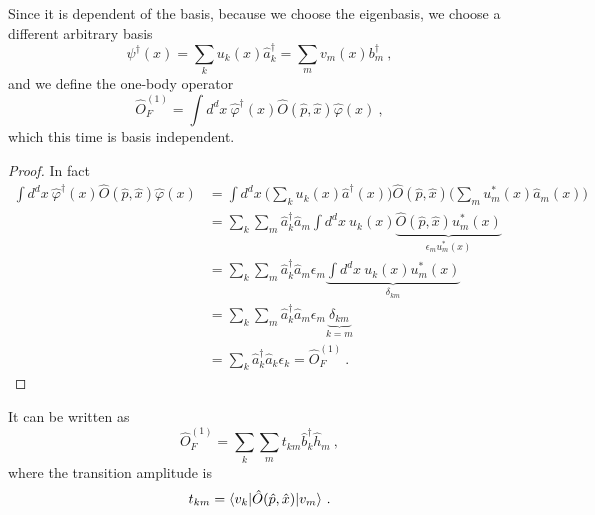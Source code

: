     Since it is dependent of the basis, because we choose the eigenbasis, we choose a different arbitrary basis 
    \begin{equation*}
        \psi^\dagger (x) = \sum_k u_k (x) \hat a^\dagger_k = \sum_m v_m (x) b^\dagger_m ~,
    \end{equation*}
    and we define the one-body operator
    \begin{equation*}
        \hat O^{(1)}_F = \int d^d x ~ \hat \varphi^\dagger (x) \hat O (\hat p, \hat x) \hat \varphi (x) ~,
    \end{equation*}
    which this time is basis independent.
    \begin{proof}
        In fact 
        \begin{equation*}
        \begin{aligned}
            \int d^d x ~ \hat \varphi^\dagger (x) \hat O (\hat p, \hat x) \hat \varphi (x) & = \int d^d x ~ \Big ( \sum_k u_k(x) \hat a^\dagger (x) \Big ) \hat O (\hat p, \hat x) \Big ( \sum_m u_m^* (x) \hat a_m (x) \Big ) \\ & = \sum_k \sum_m \hat a_k^\dagger \hat a_m \int d^d x ~ u_k (x) \underbrace{\hat O(\hat p, \hat x) u^*_m (x)}_{\epsilon_m u^*_m (x)} \\ & = \sum_k \sum_m \hat a_k^\dagger \hat a_m \epsilon_m \underbrace{\int d^d x ~ u_k (x) u^*_m (x)}_{\delta_{km}} \\ & = \sum_k \sum_m \hat a_k^\dagger \hat a_m \epsilon_m \underbrace{\delta_{km}}_{k = m} \\ & = \sum_k\hat a_k^\dagger \hat a_k \epsilon_k = \hat O^{(1)}_F ~.
        \end{aligned}
        \end{equation*}
    \end{proof}
    It can be written as 
    \begin{equation*}
        \hat O^{(1)}_F = \sum_k \sum_m t_{km} \hat b_k^\dagger \hat h_m ~,
    \end{equation*}
    where the transition amplitude is
    \begin{equation*}
        t_{km} = \langle v_k\vert \hat O (\hat p, \hat x) \vert v_m\rangle ~.
    \end{equation*}



